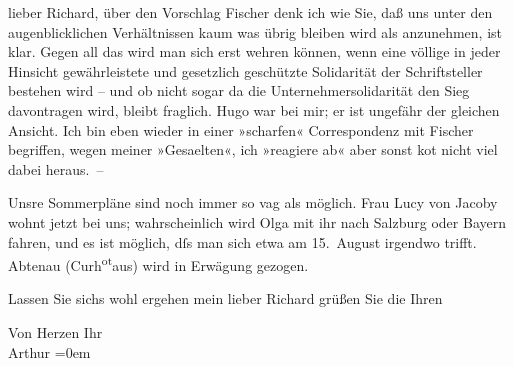 \pstart{}lieber Richard,\pend\vspace{0.5em}
\pstart
           über den Vorschlag Fischer denk ich wie Sie,
               daß uns unter den augenblicklichen Verhältnissen kaum was übrig bleiben wird als
               anzunehmen, ist klar. Gegen all das wird man sich erst wehren können, wenn eine
               völlige in jeder Hinsicht gewährleistete und gesetzlich geschützte Solidarität der
               Schriftsteller bestehen wird – und ob nicht sogar da{\geminationn}
               die Unternehmersolidarität den Sieg davontragen wird, bleibt fraglich. Hugo war \label{K_L02350-1v}\label{K_L02350-1} bei mir; er ist ungefähr der gleichen Ansicht. Ich bin eben wieder in einer
               »scharfen« Correspondenz mit Fischer
               begriffen, wegen meiner »Gesa{\geminationm}elten«, ich »reagiere ab« aber sonst ko{\geminationm}t nicht viel {\pb}dabei
               heraus. –\pend
           
\pstart
           Unsre Sommerpläne sind noch immer so vag als möglich. Frau Lucy von Jacoby wohnt jetzt bei uns; wahrscheinlich wird Olga mit ihr nach Salzburg oder Bayern fahren, und es ist
               möglich, dſs man sich etwa am 15. August irgendwo trifft. Abtenau (Curh\substVorne{}\textsuperscript{ot}\substDazwischen{}aus\substHinten{}) wird in Erwägung gezogen.\pend
           
\pstart
           Lassen Sie sichs wohl ergehen mein lieber Richard grüßen Sie die Ihren\pend
           
\pstart
           Von Herzen Ihr{\\[\baselineskip]}\spacefill\mbox{Arthur}\pend
           \leftskip=0em{}\endnumbering{}  
      